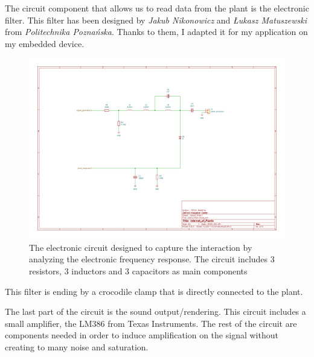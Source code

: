
The circuit component that allows us to read data from the plant is the electronic filter.
This filter has been designed by \textit{Jakub Nikonowicz} and \textit{Łukasz Matuszewski} 
from \textit{Politechnika Poznańska}.
Thanks to them, I adapted it for my application on my embedded device. 

\begin{figure}[h!]
    \centering
    \includegraphics[width=\textwidth]{images/iop-plant_filter.pdf}
    \caption{The electronic circuit designed to capture the interaction by analyzing the electronic
    frequency response. The circuit includes 3 resistors, 3 inductors and 3 capacitors as main components} 
    \vspace{0.1cm}
    \label{fig:iop_schematic_filter}
\end{figure}

This filter is ending by a crocodile clamp that is directly connected to the plant.

The last part of the circuit is the sound output/rendering. This circuit includes a small amplifier,
the LM386 from Texas Instruments. The rest of the circuit are components needed in order to 
induce amplification on the signal without creating to many noise and saturation.

